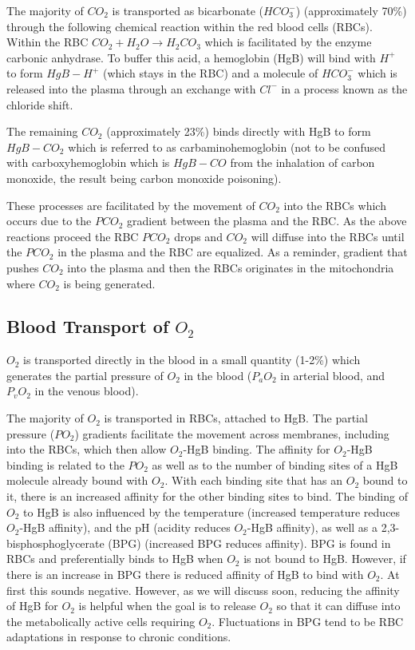 The majority of $CO_2$ is transported as bicarbonate ($HCO_3^-$) (approximately 70\%) through the following chemical reaction within the red blood cells (RBCs). 
Within the RBC $CO_2 + H_2O \rightarrow H_2CO_3$ which is facilitated by the enzyme carbonic anhydrase. To buffer this acid, a hemoglobin (HgB) will bind with $H^+$ to form $HgB-H^+$ (which stays in the RBC) and a molecule of $HCO_3^-$ which is released into the plasma through an exchange with $Cl^-$ in a process known as the chloride shift.

The remaining $CO_2$ (approximately 23\%) binds directly with HgB to form $HgB-CO_2$ which is referred to as carbaminohemoglobin (not to be confused with carboxyhemoglobin which is $HgB-CO$ from the inhalation of carbon monoxide, the result being carbon monoxide poisoning). 

These processes are facilitated by the movement of $CO_2$ into the RBCs which occurs due to the $PCO_2$ gradient between the plasma and the RBC. As the above reactions proceed the RBC $PCO_2$ drops and $CO_2$ will diffuse into the RBCs until the $PCO_2$ in the plasma and the RBC are equalized. As a reminder, gradient that pushes $CO_2$ into the plasma and then the RBCs originates in the mitochondria where $CO_2$ is being generated.


\subsection{Blood Transport of $O_2$}

$O_2$ is transported directly in the blood in a small quantity (1-2\%) which generates the partial pressure of $O_2$ in the blood ($P_aO_2$ in arterial blood, and $P_vO_2$ in the venous blood). 

The majority of $O_2$ is transported in RBCs, attached to HgB. The partial pressure ($PO_2$) gradients facilitate the movement across membranes, including into the RBCs, which then allow $O_2$-HgB binding. The affinity for $O_2$-HgB binding is related to the $PO_2$ as well as to the number of binding sites of a HgB molecule already bound with $O_2$. With each binding site that has an $O_2$ bound to it, there is an increased affinity for the other binding sites to bind. The binding of $O_2$ to HgB is also influenced by the temperature (increased temperature reduces $O_2$-HgB affinity), and the pH (acidity reduces $O_2$-HgB affinity), as well as a 2,3-bisphosphoglycerate (BPG) (increased BPG reduces affinity). BPG is found in RBCs and preferentially binds to HgB when $O_2$ is not bound to HgB. However, if there is an increase in BPG there is reduced affinity of HgB to bind with $O_2$. At first this sounds negative. However, as we will discuss soon, reducing the affinity of HgB for $O_2$ is helpful when the goal is to release $O_2$ so that it can diffuse into the metabolically active cells requiring $O_2$. Fluctuations in BPG tend to be RBC adaptations in response to chronic conditions.

